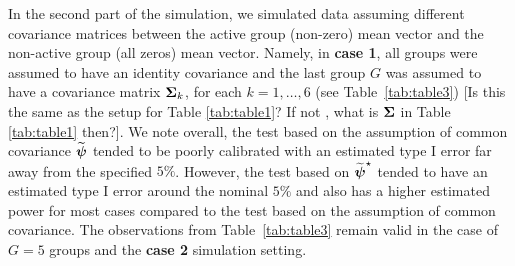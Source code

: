 \documentclass[times,sort&compress,3p]{elsarticle}
\theoremstyle{plain}%
\theoremstyle{definition}
\def\boldpsi{{\mbox{\boldmath $\psi$}}}
\newcommand{\uSigma}            {\mbox{\boldmath$\Sigma$}}
\begin{document}
In the second part of the simulation, we simulated data assuming different covariance matrices between the active group (non-zero) mean vector and the non-active group (all zeros) mean vector. Namely, in {\bf case 1}, all groups were assumed to have an identity covariance and the last group $G$ was assumed to have a covariance matrix $\uSigma_k$, for each $k = 1, \ldots, 6$ (see Table~\ref{tab:table3}) {\color{blue}[Is this the same as the setup for Table \ref{tab:table1}? If not , what is $\uSigma$ in Table \ref{tab:table1} then?]}. We note overall, the test based on the assumption of common covariance $\widetilde{\boldpsi}$ tended to be poorly calibrated with an estimated type I error far away from the specified $5\%$. However, the test based on $\widetilde{\boldpsi}^{\star}$ tended to have an estimated type I error around the nominal $5\%$ and also has a higher estimated power for most cases compared to the test based on the assumption of common covariance. 
The observations from Table~\ref{tab:table3} remain valid in the case of $G=5$ groups and the {\bf case 2} simulation setting. 
\end{document}
